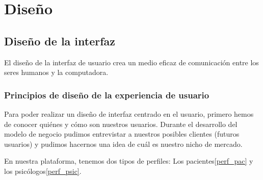 \chapter{Diseño}


\section{Diseño de la interfaz}
El diseño de la interfaz de usuario crea un medio eficaz de comunicación entre los seres humanos y la computadora.


\subsection{Principios de diseño de la experiencia de usuario}
Para poder realizar un diseño de interfaz centrado en el usuario, primero hemos de conocer quiénes y cómo son nuestros usuarios. Durante el desarrollo del modelo de negocio pudimos entrevistar a nuestros posibles clientes (futuros usuarios) y pudimos hacernos una idea de cuál es nuestro nicho de mercado.


En nuestra plataforma, tenemos dos tipos de perfiles: Los pacientes\ref{perf_pac} y los psicólogos\ref{perf_psic}.


